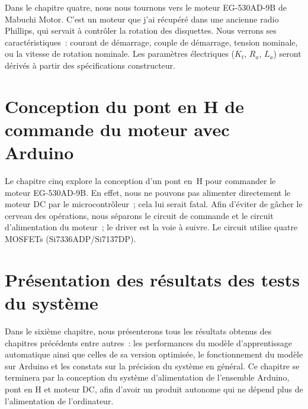 \documentclass[a4paper,12pt,twoside]{report}
\theoremstyle{definition}
\theoremstyle{plain}
\theoremstyle{remark}
\begin{document}

Dans le chapitre quatre, nous nous tournons vers le moteur EG-530AD-9B de Mabuchi Motor.
C'est un moteur que j'ai récupéré dans une ancienne radio Phillips, qui servait à contrôler
la rotation des disquettes. Nous verrons ses caractéristiques~: courant de démarrage, couple
de démarrage, tension nominale, ou la vitesse de rotation nominale. Les paramètres
électriques ($K_t$, $R_a$, $L_a$) seront dérivés à partir des spécifications constructeur.

\chapter{Conception du pont en H de commande du moteur avec Arduino}
\label{chap:ponth}


Le chapitre cinq explore la conception d'un pont en~H pour commander le moteur EG-530AD-9B.
En effet, nous ne pouvons pas alimenter directement le moteur DC par le microcontrôleur~; cela
lui serait fatal. Afin d'éviter de gâcher le cerveau des opérations, nous séparons le circuit
de commande et le circuit d'alimentation du moteur~; le driver est la voie à suivre. Le
circuit utilise quatre MOSFETs (Si7336ADP/Si7137DP).

\chapter{Présentation des résultats des tests du système}
\label{chap:resultats}


Dans le sixième chapitre, nous présenterons tous les résultats obtenus des chapitres
précédents entre autres~: les performances du modèle d'apprentissage automatique ainsi que
celles de sa version optimisée, le fonctionnement du modèle sur Arduino et les constats sur
la précision du système en général. Ce chapitre se terminera par la conception du système
d'alimentation de l'ensemble Arduino, pont en H et moteur DC, afin d'avoir un produit
autonome qui ne dépend plus de l'alimentation de l'ordinateur.

\end{document}
